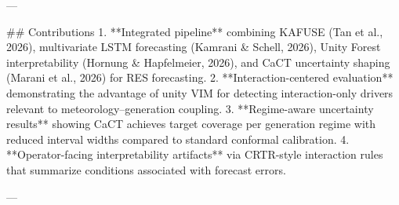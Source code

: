 ---

## Contributions  
1. **Integrated pipeline** combining KAFUSE (Tan et al., 2026), multivariate LSTM forecasting (Kamrani & Schell, 2026), Unity Forest interpretability (Hornung & Hapfelmeier, 2026), and CaCT uncertainty shaping (Marani et al., 2026) for RES forecasting.  
2. **Interaction-centered evaluation** demonstrating the advantage of unity VIM for detecting interaction-only drivers relevant to meteorology–generation coupling.  
3. **Regime-aware uncertainty results** showing CaCT achieves target coverage per generation regime with reduced interval widths compared to standard conformal calibration.  
4. **Operator-facing interpretability artifacts** via CRTR-style interaction rules that summarize conditions associated with forecast errors.

---